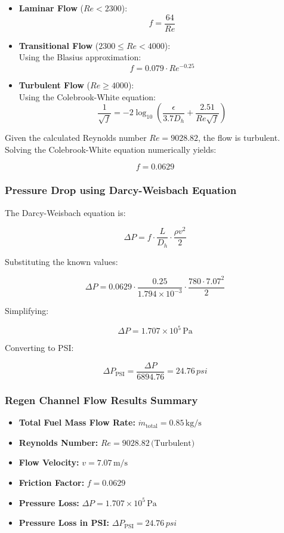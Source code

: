 \begin{itemize}
    \item \textbf{Laminar Flow} ($Re < 2300$): 
    \[
    f = \frac{64}{Re}
    \]
    
    \item \textbf{Transitional Flow} ($2300 \leq Re < 4000$): \\
    Using the Blasius approximation:
    \[
    f = 0.079 \cdot Re^{-0.25}
    \]
    
    \item \textbf{Turbulent Flow} ($Re \geq 4000$): \\
    Using the Colebrook-White equation:
    \[
    \frac{1}{\sqrt{f}} = -2 \log_{10} \left(\frac{\epsilon}{3.7D_h} + \frac{2.51}{Re \sqrt{f}} \right)
    \]
\end{itemize}

Given the calculated Reynolds number \(Re = 9028.82\), the flow is turbulent. Solving the Colebrook-White equation numerically yields:

\[
f = 0.0629
\]



\subsubsection{Pressure Drop using Darcy-Weisbach Equation}

The Darcy-Weisbach equation is:

\[
\Delta P = f \cdot \frac{L}{D_h} \cdot \frac{\rho v^2}{2}
\]

Substituting the known values:

\[
\Delta P = 0.0629 \cdot \frac{0.25}{1.794 \times 10^{-3}} \cdot \frac{780 \cdot 7.07^2}{2}
\]

Simplifying:

\[
\Delta P = 1.707 \times 10^5 \, \si{\pascal}
\]

Converting to PSI:

\[
\Delta P_{\text{PSI}} = \frac{\Delta P}{6894.76} = 24.76 \, \si{psi}
\]


\subsubsection{Regen Channel Flow Results Summary}

\begin{itemize}
    \item \textbf{Total Fuel Mass Flow Rate:} \(\dot{m}_{\text{total}} = 0.85 \, \si{\kilo\gram\per\second}\)
    \item \textbf{Reynolds Number:} \(Re = 9028.82 \, \text{(Turbulent)}\)
    \item \textbf{Flow Velocity:} \(v = 7.07 \, \si{\meter\per\second}\)
    \item \textbf{Friction Factor:} \(f = 0.0629\)
    \item \textbf{Pressure Loss:} \(\Delta P = 1.707 \times 10^5 \, \si{\pascal}\)
    \item \textbf{Pressure Loss in PSI:} \(\Delta P_{\text{PSI}} = 24.76 \, \si{psi}\)
\end{itemize}
